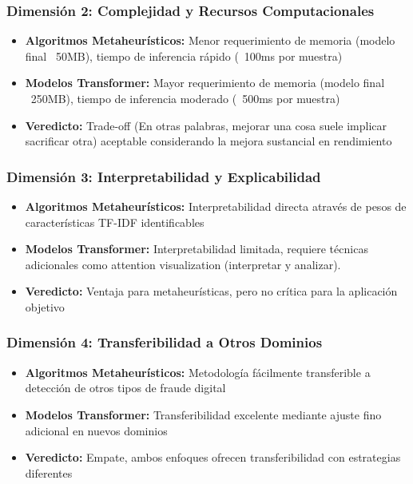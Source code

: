 \subsubsection{Dimensión 2: Complejidad y Recursos Computacionales}

\begin{itemize}
    \item \textbf{Algoritmos Metaheurísticos:} Menor requerimiento de memoria (modelo final ~50MB), tiempo de inferencia rápido (~100ms por muestra)
    \item \textbf{Modelos Transformer:} Mayor requerimiento de memoria (modelo final ~250MB), tiempo de inferencia moderado (~500ms por muestra)
    \item \textbf{Veredicto:} Trade-off (En otras palabras, mejorar una cosa suele implicar sacrificar otra) aceptable considerando la mejora sustancial en rendimiento
\end{itemize}

\subsubsection{Dimensión 3: Interpretabilidad y Explicabilidad}

\begin{itemize}
    \item \textbf{Algoritmos Metaheurísticos:} Interpretabilidad directa através de pesos de características TF-IDF identificables
    \item \textbf{Modelos Transformer:} Interpretabilidad limitada, requiere técnicas adicionales como attention visualization (interpretar y analizar).
    \item \textbf{Veredicto:} Ventaja para metaheurísticas, pero no crítica para la aplicación objetivo
\end{itemize}

\subsubsection{Dimensión 4: Transferibilidad a Otros Dominios}

\begin{itemize}
    \item \textbf{Algoritmos Metaheurísticos:} Metodología fácilmente transferible a detección de otros tipos de fraude digital
    \item \textbf{Modelos Transformer:} Transferibilidad excelente mediante ajuste fino adicional en nuevos dominios
    \item \textbf{Veredicto:} Empate, ambos enfoques ofrecen transferibilidad con estrategias diferentes
\end{itemize}

